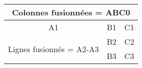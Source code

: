 \begin{tabular}{|c|c|c|}
\hline
	\multicolumn{3}{|c|}{Colonnes fusionnées = ABC0} \\
	\hline
	A1 & B1 & C1 \\
	\hline
	\multirow{2}{*}{Lignes fusionnés = A2-A3}
	& B2 & C2 \\
	& B3 & C3 \\
\hline
\end{tabular}